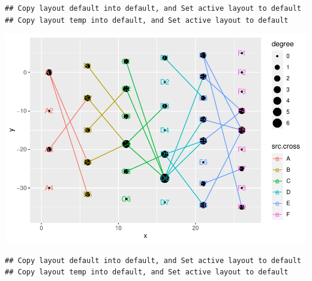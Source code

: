 \documentclass[
]{article}
\newenvironment{Shaded}{\begin{snugshade}}{\end{snugshade}}
\newcommand{\CommentTok}[1]{\textcolor[rgb]{0.56,0.35,0.01}{\textit{#1}}}
\newcommand{\KeywordTok}[1]{\textcolor[rgb]{0.13,0.29,0.53}{\textbf{#1}}}
\newcommand{\NormalTok}[1]{#1}
\newcommand{\OperatorTok}[1]{\textcolor[rgb]{0.81,0.36,0.00}{\textbf{#1}}}
\newcommand{\StringTok}[1]{\textcolor[rgb]{0.31,0.60,0.02}{#1}}
\begin{document}
\begin{Shaded}
\end{Shaded}

\begin{verbatim}
## Copy layout default into default, and Set active layout to default
## Copy layout temp into default, and Set active layout to default
\end{verbatim}

\includegraphics{ReadMe_files/figure-latex/unnamed-chunk-6-5.pdf}

\begin{Shaded}
\end{Shaded}

\begin{verbatim}
## Copy layout default into default, and Set active layout to default
## Copy layout temp into default, and Set active layout to default
\end{verbatim}
\end{document}

